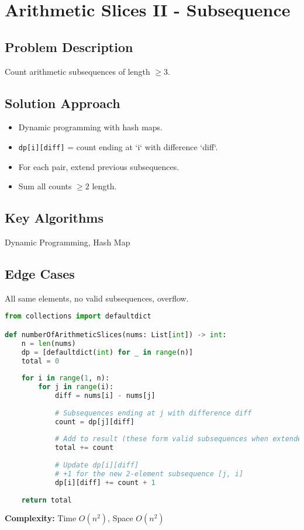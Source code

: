 \documentclass[10pt, a4paper]{article}
\begin{document}
\section{Arithmetic Slices II - Subsequence}
\subsection*{Problem Description}
Count arithmetic subsequences of length $\ge 3$.

\subsection*{Solution Approach}
\begin{itemize}
    \item Dynamic programming with hash maps.
    \item \texttt{dp[i][diff]} = count ending at `i` with difference `diff`.
    \item For each pair, extend previous subsequences.
    \item Sum all counts $\ge 2$ length.
\end{itemize}

\subsection*{Key Algorithms}
Dynamic Programming, Hash Map

\subsection*{Edge Cases}
All same elements, no valid subsequences, overflow.

\begin{lstlisting}[language=Python]
from collections import defaultdict

def numberOfArithmeticSlices(nums: List[int]) -> int:
    n = len(nums)
    dp = [defaultdict(int) for _ in range(n)]
    total = 0
    
    for i in range(1, n):
        for j in range(i):
            diff = nums[i] - nums[j]
            
            # Subsequences ending at j with difference diff
            count = dp[j][diff]
            
            # Add to result (these form valid subsequences when extended)
            total += count
            
            # Update dp[i][diff]
            # +1 for the new 2-element subsequence [j, i]
            dp[i][diff] += count + 1
    
    return total
\end{lstlisting}
\textbf{Complexity:} Time $O(n^2)$, Space $O(n^2)$
\end{document}
